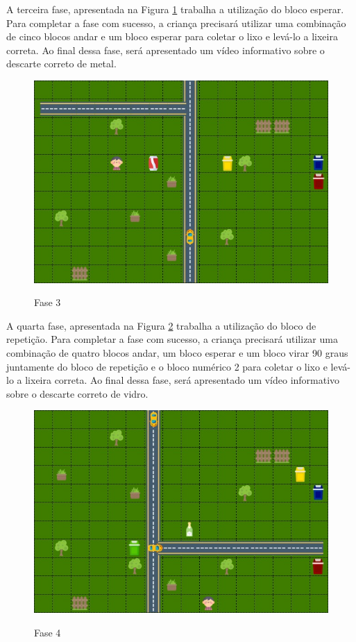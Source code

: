     A terceira fase, apresentada na Figura \ref{figura:fase_3} trabalha a utilização do bloco esperar. Para completar a fase com sucesso, a criança precisará utilizar uma combinação de cinco blocos andar e um bloco esperar para coletar o lixo e levá-lo a lixeira correta. Ao final dessa fase, será apresentado um vídeo informativo sobre o descarte correto de metal.
    
    \begin{figure}[H]
        \caption{Fase 3}
        \centering
        \includegraphics[width=12cm]{Imagens/Cap3/Fases/Fase3.jpg}
        \label{figura:fase_3}
    \end{figure}
    
    A quarta fase, apresentada na Figura \ref{figura:fase_4} trabalha a utilização do bloco de repetição. Para completar a fase com sucesso, a criança precisará utilizar uma combinação de quatro blocos andar, um bloco esperar e um bloco virar 90 graus juntamente do bloco de repetição e o bloco numérico 2 para coletar o lixo e levá-lo a lixeira correta. Ao final dessa fase, será apresentado um vídeo informativo sobre o descarte correto de vidro.
    
    \begin{figure}[H]
        \caption{Fase 4}
        \centering
        \includegraphics[width=12cm]{Imagens/Cap3/Fases/Fase4.jpg}
        \label{figura:fase_4}
    \end{figure}


